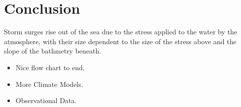 \section{Conclusion}
\label{sec:8_Conclusion}

Storm surges rise out of the sea due to the stress applied to the water by
the atmosphere, with their size dependent to the size of the stress above and
the slope of the bathmetry beneath. 

\begin{itemize}
\item Nice flow chart to end.
\item More Climate Models.
\item Observational Data.
\end{itemize}
